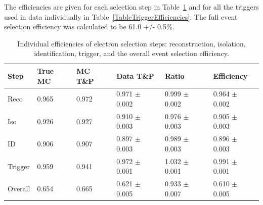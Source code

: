 
The efficiencies are given for each selection step in Table~\ref{TableEfficiencies} %
and for all the triggers used in data individually in Table~\ref{TableTriggerEfficiencies}.  
The full event selection efficiency was calculated to be 
61.0 +/- 0.5\%.  

\begin{table}[htbp]
  \begin{center}
    \caption[\fixspacing Individual efficiencies of electron selection steps]
    {\fixspacing Individual efficiencies of electron selection steps: 
    reconstruction, isolation, identification, trigger, 
    and the overall event selection efficiency.}
    \label{TableEfficiencies}
    \begin{tabular}[]{ | l | l | l | l | l | l | }
      \hline
      Step & True MC & MC T\&P & Data T\&P & Ratio & Efficiency \\ \hline \hline
      Reco & 0.965 & 0.972 & 0.971 $\pm$ 0.002 & 0.999 $\pm$ 0.002 & 0.964 $\pm$ 0.002 \\ \hline
      Iso & 0.926 & 0.927 & 0.910 $\pm$ 0.003 & 0.976 $\pm$ 0.003 & 0.905 $\pm$ 0.003 \\ \hline
      ID & 0.906 & 0.907 & 0.897 $\pm$ 0.003 & 0.989 $\pm$ 0.003 & 0.896 $\pm$ 0.003 \\ \hline
      Trigger & 0.959 & 0.941 & 0.972 $\pm$ 0.001 & 1.032 $\pm$ 0.001 & 0.991 $\pm$ 0.001 \\ \hline \hline
      Overall & 0.654 & 0.665 & 0.621 $\pm$ 0.005 & 0.933 $\pm$ 0.007 & 0.610 $\pm$ 0.005 \\ \hline %
    \end{tabular}
  \end{center}
\end{table}


